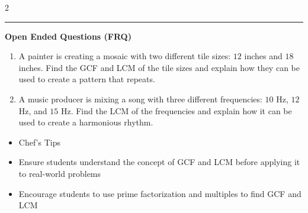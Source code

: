 \documentclass[10pt]{article}
\begin{document}
\begin{multicols}{2}
\begin{enumerate}[label=\textbf{Q\arabic*.}, leftmargin=*, itemsep=6pt, parsep=0pt]
\end{enumerate}
\end{multicols}

\vspace{-0.2cm}
\hrule
\vspace{0.2cm}
\textbf{\small Open Ended Questions (FRQ)}
\begin{enumerate}[label=\textbf{Q\arabic*.}, start=9, itemsep=5pt, topsep=0pt]

  \item \small A painter is creating a mosaic with two different tile sizes: $12$ inches and $18$ inches. Find the GCF and LCM of the tile sizes and explain how they can be used to create a pattern that repeats. \vspace{2cm}

  \item \small A music producer is mixing a song with three different frequencies: $10$ Hz, $12$ Hz, and $15$ Hz. Find the LCM of the frequencies and explain how it can be used to create a harmonious rhythm. \vspace{2cm}

\end{enumerate}

\vfill

\begin{tcolorbox}[colback=blue!5, colframe=mainblue!50, title=\small \textbf{Chef's Tips}, fonttitle=\bfseries, bottom=1mm]
\begin{itemize}[noitemsep, topsep=2pt, leftmargin=0.5cm]
  \item \scriptsize Chef's Tips\item \scriptsize Ensure students understand the concept of GCF and LCM before applying it to real-world problems\item \scriptsize Encourage students to use prime factorization and multiples to find GCF and LCM
\end{itemize}
\end{tcolorbox}
\end{document}
